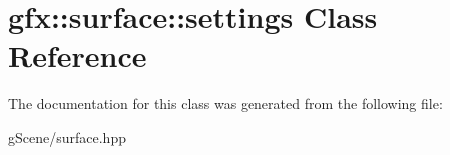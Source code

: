 \hypertarget{classgfx_1_1surface_1_1settings}{\section{gfx\-:\-:surface\-:\-:settings Class Reference}
\label{classgfx_1_1surface_1_1settings}
}


The documentation for this class was generated from the following file\-:\begin{DoxyCompactItemize}
\item 
g\-Scene/surface.\-hpp\end{DoxyCompactItemize}
